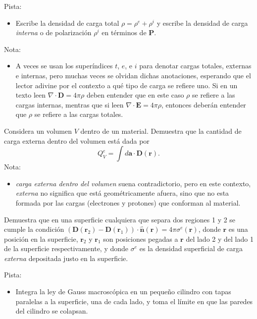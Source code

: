 \documentclass{exam}
\begin{document}
\begin{questions}
  Pista:
  \begin{itemize}
  \item Escribe la densidad de carga total $\rho=\rho^e+\rho^i$ y
    escribe la densidad de carga {\em interna} o de polarización
    $\rho^i$ en términos de $\bm P$.
  \end{itemize}

  Nota:
  \begin{itemize}
  \item A veces se usan los superíndices $t$, $e$, e $i$ para denotar
    cargas totales, externas e internas, pero muchas veces se olvidan
    dichas anotaciones, esperando que el lector adivine por el
    contexto a qué tipo de carga se refiere uno. Si en un texto leen
    $\nabla\cdot \bm D=4\pi\rho$ deben entender que en este caso $\rho$
    se refiere a las cargas internas, mentras que si leen $\nabla
    \cdot\bm E=4\pi\rho$, entonces deberán entender que $\rho$ se refiere a las
    cargas totales.
  \end{itemize}

  \question Considera un volumen $V$ dentro de un material. Demuestra
  que la cantidad de carga externa dentro del volumen está dada por
  $$
  Q^e_V=\int d\bm a\cdot\bm D(\bm r).
  $$
  Nota:
  \begin{itemize}
  \item {\em carga externa dentro del volumen} suena contradictorio, pero
    en este contexto, {\em externa} no significa que está
    geométricamente afuera, sino que no esta formada por las cargas
    (electrones y protones) que conforman al material.
  \end{itemize}

  \question Demuestra que en una superficie cualquiera que separa dos
  regiones 1 y 2 se cumple la condición
  $(\bm D(\bm r_2)-\bm D(\bm r_1))\cdot\hat{\bm n}(\bm
  r)=4\pi\sigma^e(\bm r)$, donde $\bm r$ es una posición en la superficie, $\bm
  r_2$ y $\bm r_1$ son posiciones pegadas a $\bm r$ del lado 2 y del
  lado 1 de la superficie respectivamente, y donde $\sigma^e$ es la
  densidad superficial de carga {\em externa} depositada justo en la superficie.

  Pista:
  \begin{itemize}
  \item Integra la ley de Gauss macroscópica en un pequeño cilindro con tapas
    paralelas a la superficie, una de cada lado, y toma el límite en
    que las paredes del cilindro se colapsan.
  \end{itemize}


\end{questions}
\end{document}
